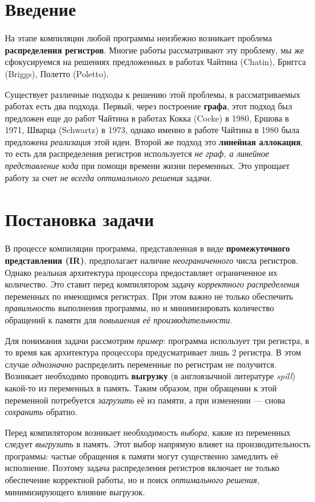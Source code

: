\documentclass[12pt]{article}
\begin{document}
\section{Введение}

На этапе компиляции любой программы неизбежно возникает проблема \textbf{распределения регистров}. %
Многие работы рассматривают эту проблему, мы же сфокусируемся на решениях предложенных в
работах Чайтина (Chatin), Бриггса (Briggs), Полетто (Poletto). %

Существует различные подходы к решению этой проблемы, в рассматриваемых работах есть два
подхода. Первый, через построение \textbf{графа}, этот подход был предложен еще до работ Чайтина в
работах Кокка (Cocke) в 1980, Ершова в 1971, Шварца (Schwartz) в 1973, однако именно в
работе Чайтина в 1980 была предложена \textit{реализация} этой идеи. Второй же подход это \textbf{линейная аллокация},
то есть для распределения регистров используется \textit{не граф, а линейное представление кода} при
помощи времени жизни переменных. Это упрощает работу за счет \textit{не всегда оптимального решения} задачи.

\section{Постановка задачи}
В процессе компиляции программа, представленная в виде \textbf{промежуточного представления (IR)}, предполагает
наличие \textit{неограниченного} числа регистров. Однако реальная архитектура процессора предоставляет ограниченное
их количество. Это ставит перед компилятором задачу \textit{корректного распределения} переменных по имеющимся
регистрах. При этом важно не только обеспечить \textit{правильность} выполнения программы, но и минимизировать
количество обращений к памяти для \textit{повышения её производительности}. %

Для понимания задачи рассмотрим \textit{пример}: программа использует три регистра, в то время как архитектура
процессора предусматривает лишь 2 регистра. В этом случае \textit{однозначно} распределить переменные по регистрам
не получится. Возникает необходимо проводить \textbf{выгрузку} (в англоязычной литературе \textit{spill})
какой-то из переменных в память. Таким образом, при обращении к этой переменной потребуется \textit{загрузить}
её из памяти, а при изменении — снова \textit{сохранить} обратно.

Перед компилятором возникает необходимость \textit{выбора}, какие из переменных следует \textit{выгрузить}
в память. Этот выбор напрямую влияет на производительность программы: частые обращения к памяти могут
существенно замедлить её исполнение. Поэтому задача распределения регистров включает не только обеспечение
корректной работы, но и поиск \textit{оптимального решения}, минимизирующего влияние выгрузок.
\end{document}
